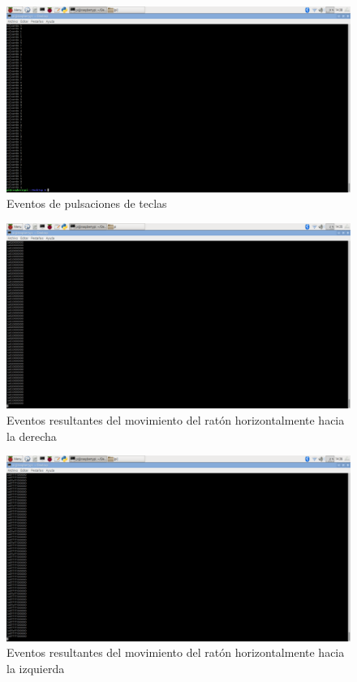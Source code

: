     \begin{figure}[H]
    \centering
    \includegraphics[scale = 0.25]{capitulo_04/figuras_dir/teclas.jpg}
    \caption{Eventos de pulsaciones de teclas}
    \label{fig: Eventos de pulsaciones de teclas}
    \end{figure}

    \begin{figure}[p]
    \centering
    \includegraphics[scale = 0.25]{capitulo_04/figuras_dir/derecha.jpg}
    \caption{Eventos resultantes del movimiento del ratón horizontalmente hacia la derecha}
    \label{fig: horizontalmente hacia la derecha}
    \end{figure}

    \begin{figure}[p]
    \centering
    \includegraphics[scale = 0.25]{capitulo_04/figuras_dir/izquierda.jpg}
    \caption{Eventos resultantes del movimiento del ratón horizontalmente hacia la izquierda}
    \label{fig: horizontalmente hacia la izquierda}
    \end{figure}

